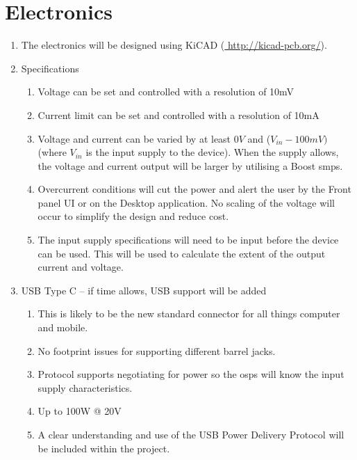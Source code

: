 \documentclass[12pt,a4paper]{article}
\begin{document}
\section{Electronics}
\begin{enumerate}[label*=\arabic*.]
\item The electronics will be designed using KiCAD (\url{ http://kicad-pcb.org/}).
\item Specifications
	\begin{enumerate}[label*=\arabic*.]
	\item Voltage can be set and controlled with a resolution of 10mV
	\item Current limit can be set and controlled with a resolution of 10mA
	\item Voltage and current can be varied by at least $0V$ and ($V_{in} - 100mV)$ (where $V_{in}$ is the input supply to the device). When the supply allows, the voltage and current output will be larger by utilising a Boost \gls{smps}.
	\item Overcurrent conditions will cut the power and alert the user by the Front panel UI or on the Desktop application. No scaling of the voltage will occur to simplify the design and reduce cost. 
	\item The input supply specifications will need to be input before the device can be used. This will be used to calculate the extent of the output current and voltage. 
	\end{enumerate}
\item  USB Type C – if time allows, USB support will be added
	\begin{enumerate}[label*=\arabic*.]
	\item This is likely to be the new standard connector for all things computer and mobile.
	\item No footprint issues for supporting different barrel jacks.
	\item Protocol supports negotiating for power so the \gls{osps} will know the input supply characteristics. 
	\item Up to 100W @ 20V
	\item A clear understanding and use of the USB Power Delivery Protocol will be included within the project. 
	\end{enumerate}

\end{enumerate}
\end{document}
